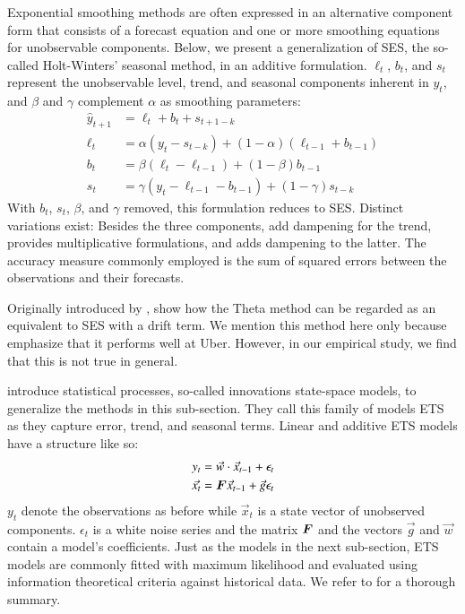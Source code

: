 Exponential smoothing methods are often expressed in an alternative component
    form that consists of a forecast equation and one or more smoothing
    equations for unobservable components.
Below, we present a generalization of SES, the so-called Holt-Winters'
    seasonal method, in an additive formulation.
$\ell_t$, $b_t$, and $s_t$ represent the unobservable level, trend, and
    seasonal components inherent in $y_t$, and $\beta$ and $\gamma$ complement
    $\alpha$ as smoothing parameters:
\begin{align*}
\hat{y}_{t+1} & = \ell_t + b_t + s_{t+1-k} \\
\ell_t        & = \alpha(y_t - s_{t-k}) + (1 - \alpha)(\ell_{t-1} + b_{t-1}) \\
b_t           & = \beta (\ell_{t} - \ell_{t-1}) + (1 - \beta) b_{t-1} \\
s_t           & = \gamma (y_t - \ell_{t-1} - b_{t-1}) + (1-\gamma)s_{t-k}
\end{align*}
With $b_t$, $s_t$, $\beta$, and $\gamma$ removed, this formulation reduces to
    SES.
Distinct variations exist: Besides the three components, \cite{gardner1985}
    add dampening for the trend, \cite{pegels1969} provides multiplicative
    formulations, and \cite{taylor2003} adds dampening to the latter.
The accuracy measure commonly employed is the sum of squared errors between
    the observations and their forecasts.

Originally introduced by \cite{assimakopoulos2000}, \cite{hyndman2003} show
    how the Theta method can be regarded as an equivalent to SES with a drift
    term.
We mention this method here only because \cite{bell2018} emphasize that it
    performs well at Uber.
However, in our empirical study, we find that this is not true in general.

\cite{hyndman2002} introduce statistical processes, so-called innovations	
    state-space models, to generalize the methods in this sub-section.
They call this family of models ETS as they capture error, trend, and seasonal
    terms.
Linear and additive ETS models have a structure like so:
\begin{align*}
y_t       & = \vec{w} \cdot \vec{x}_{t-1} + \epsilon_t \\
\vec{x_t} & = \bm{F} \vec{x}_{t-1} + \vec{g} \epsilon_t
\end{align*}
$y_t$ denote the observations as before while $\vec{x}_t$ is a state vector of
    unobserved components.
$\epsilon_t$ is a white noise series and the matrix $\bm{F}$ and the vectors
    $\vec{g}$ and $\vec{w}$ contain a model's coefficients.
Just as the models in the next sub-section, ETS models are commonly fitted
    with maximum likelihood and evaluated using information theoretical
    criteria against historical data.
We refer to \cite{hyndman2008b} for a thorough summary.
